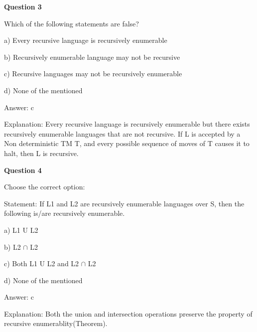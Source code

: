 \documentclass{article}
\begin{document}
\begin{mdframed}[linewidth=1pt, roundcorner=5pt, linecolor=gray!30, backgroundcolor=gray!5]
\textbf{Question 3} 

Which of the following statements are false?

a) Every recursive language is recursively enumerable

b) Recursively enumerable language may not be recursive

c) Recursive languages may not be recursively enumerable

d) None of the mentioned
\vspace{5pt} \par
\begin{tcolorbox}[colback=green!5, colframe=green!40!black, title=Solution]
Answer: c

Explanation: Every recursive language is recursively enumerable but there exists recursively enumerable languages that are not recursive. If L is accepted by a Non deterministic TM  T, and every possible sequence of moves of T causes it to halt, then L is recursive.
\end{tcolorbox}
\end{mdframed}
\newpage

\begin{mdframed}[linewidth=1pt, roundcorner=5pt, linecolor=gray!30, backgroundcolor=gray!5]
\textbf{Question 4} 

Choose the correct option:

Statement: If L1 and L2 are recursively enumerable languages over S, then the following is/are recursively enumerable.

a) L1 U L2

b) L2 $\cap$ L2

c) Both L1 U L2 and L2 $\cap$ L2

d) None of the mentioned
\vspace{5pt} \par
\begin{tcolorbox}[colback=green!5, colframe=green!40!black, title=Solution]
Answer: c

Explanation: Both the union and intersection operations preserve the property of recursive enumerablity(Theorem).
\end{tcolorbox}
\end{mdframed}
\end{document}
